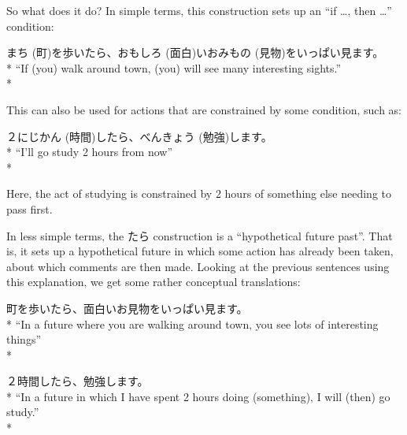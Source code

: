 \documentclass[11pt, b5paper, twoside, openright, onecolumn]{book}
\makeatletter
\newcommand*{\rubystack}[2]{{\relscale{0.5}%
  \begin{tabular}[b]{@{}c@{}}%
    {#1}\\%
   {\textscale{2}{#2}}%
  \end{tabular}}%
}
\DeclareRobustCommand*{\ruby}[2]{%
  \mbox{%
    \setlength{\parskip}{0ex}%
    \BeginAccSupp{method=pdfstringdef,ActualText={#1}}%
      \rubystack{\phantom{#2}}{#1}%
      \llap{%
        \rubystack{#2}{\phantom{#1}}%
      }%
    \EndAccSupp{}%
  }%
}
\renewcommand*{\ruby}[2]{#2 (#1)}%
\newenvironment{exampleblock}{
\setlength{\parindent}{0.6in}
\begin{minipage}[t]{\dimexpr\textwidth-\parindent}}
{\end{minipage}}
\makeatother
\begin{document}
So what does it do? In simple terms‚ this construction sets up an “if …‚ then …” condition:

\vspace{0.4cm}
\begin{exampleblock}
\ruby{町}{まち}を歩いたら、\ruby{面白}{おもしろ}いお\ruby{見物}{みもの}をいっぱい見ます。 \\* 
“If (you) walk around town‚ (you) will see many interesting sights.” \\* 
\end{exampleblock}
\vspace{0.2cm}

This can also be used for actions that are constrained by some condition‚ such as:

\vspace{0.4cm}
\begin{exampleblock}
２\ruby{時間}{にじかん}したら、\ruby{勉強}{べんきょう}します。 \\* 
“I’ll go study 2 hours from now” \\* 
\end{exampleblock}
\vspace{0.2cm}

Here‚ the act of studying is constrained by 2 hours of something else needing to pass first.

In less simple terms‚ the たら construction is a “hypothetical future past”. That is‚ it sets up a hypothetical future in which some action has already been taken‚ about which comments are then made. Looking at the previous sentences using this explanation‚ we get some rather conceptual translations:

\vspace{0.4cm}
\begin{exampleblock}
町を歩いたら、面白いお見物をいっぱい見ます。 \\* 
“In a future where you are walking around town‚ you see lots of interesting things” \\* 
\end{exampleblock}
\vspace{0.2cm}

\begin{exampleblock}
２時間したら、勉強します。 \\* 
“In a future in which I have spent 2 hours doing (something)‚ I will (then) go study.” \\* 
\end{exampleblock}
\vspace{0.2cm}
\end{document}
